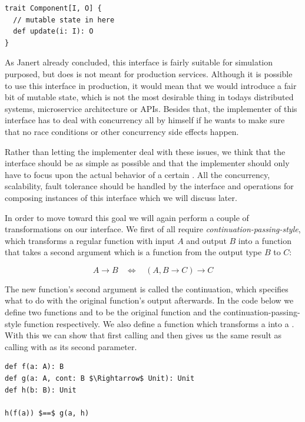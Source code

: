 \begin{lstlisting}[style=InlineScalaStyle]
trait Component[I, O] {
  // mutable state in here
  def update(i: I): O
}
\end{lstlisting}

As Janert already concluded, this interface is fairly suitable for simulation purposed, but does is not meant for production services. Although it is possible to use this interface in production, it would mean that we would introduce a fair bit of mutable state, which is not the most desirable thing in todays distributed systems, microservice architecture or APIs. Besides that, the implementer of this \comp interface has to deal with concurrency all by himself if he wants to make sure that no race conditions or other concurrency side effects happen.

Rather than letting the implementer deal with these issues, we think that the interface should be as simple as possible and that the implementer should only have to focus upon the actual behavior of a certain \comp. All the concurrency, scalability, fault tolerance should be handled by the interface and operations for composing instances of this interface which we will discuss later.

In order to move toward this goal we will again perform a couple of transformations on our \comp interface. We first of all require \textit{continuation-passing-style}, which transforms a regular function with input $A$ and output $B$ into a function that takes a second argument which is a function from the output type $B$ to $C$:

\[A \rightarrow B \ \ \ \ \Leftrightarrow \ \ \ \ (A, B \rightarrow C) \rightarrow C\]

The new function's second argument is called the continuation, which specifies what to do with the original function's output afterwards. In the code below we define two functions  and  to be the original function and the continuation-passing-style function respectively. We also define a function  which transforms a  into a . With this we can show that first calling  and then  gives us the same result as calling  with  as its second parameter.

\begin{lstlisting}[style=InlineScalaStyle]
def f(a: A): B
def g(a: A, cont: B $\Rightarrow$ Unit): Unit
def h(b: B): Unit

h(f(a)) $==$ g(a, h)
\end{lstlisting}


